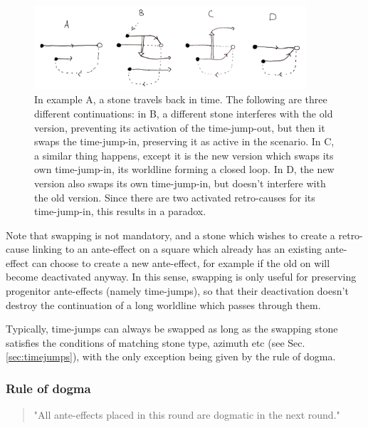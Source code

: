 \documentclass[12pt]{article}
\begin{document}
	\begin{figure}[h]
\begin{center}
    \includegraphics[width=0.9\textwidth]{images/diag_swapping}
 \caption{In example A, a stone travels back in time. The following are three different continuations: in B, a different stone interferes with the old version, preventing its activation of the time-jump-out, but then it swaps the time-jump-in, preserving it as active in the scenario. In C, a similar thing happens, except it is the new version which swaps its own time-jump-in, its worldline forming a closed loop. In D, the new version also swaps its own time-jump-in, but doesn't interfere with the old version. Since there are two activated retro-causes for its time-jump-in, this results in a paradox.}\label{fig:swapping}
\end{center}
\end{figure}

Note that swapping is not mandatory, and a stone which wishes to create a retro-cause linking to an ante-effect on a square which already has an existing ante-effect can choose to create a new ante-effect, for example if the old on will become deactivated anyway. In this sense, swapping is only useful for preserving progenitor ante-effects (namely time-jumps), so that their deactivation doesn't destroy the continuation of a long worldline which passes through them.

	Typically, time-jumps can always be swapped as long as the swapping stone satisfies the conditions of matching stone type, azimuth etc (see Sec. \ref{sec:timejumps}), with the only exception being given by the rule of dogma.
	
	\subsubsection{Rule of dogma}\label{sec:rule of dogma}
	\begin{quote}
	"All ante-effects placed in this round are dogmatic in the next round."
	\end{quote}
	
\end{document}
